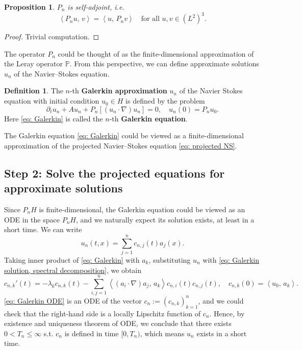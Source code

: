 \documentclass[a4paper, 12pt, oneside]{amsart}
\newtheorem{proposition}[theorem]{Proposition}
\theoremstyle{definition}
\newtheorem*{definition}{Definition}
\theoremstyle{remark}
\newcommand{\bk}[2]{\left\langle #1,\, #2 \right\rangle}
\renewcommand{\leq}{\leqslant}
\newcommand{\p}{\partial}
\newcommand{\mb}[1]{\mathbb{#1}}
\begin{document}
\begin{proposition}
    $P_n$ is self-adjoint, i.e.
    \[
        \bk{P_n u}{v} = \bk{u}{P_n v}\quad\text{for all $u, v\in (L^2)^3$}.
    \]
\end{proposition}

\begin{proof}
    Trivial computation.
\end{proof}

The operator $P_n$ could be thought of as the finite-dimensional approximation of the Leray operator $\mb{P}$. From this perspective, we can define approximate solutions $u_n$ of the Navier--Stokes equation.

\begin{definition}
    The $n$-th \textbf{Galerkin approximation} $u_n$ of the Navier Stokes equation with initial condition $u_0\in H$ is defined by the problem
    \begin{equation}
        \label{eq: Galerkin}
        \p_t u_n + Au_n + P_n[(u_n\cdot\nabla)u_n] = 0,\quad u_n(0)=P_nu_0. 
    \end{equation}
    Here \eqref{eq: Galerkin} is called the $n$-th \textbf{Galerkin equation}.
\end{definition}

The Galerkin equation \eqref{eq: Galerkin} could be viewed as a finite-dimensional approximation of the projected Navier--Stokes equation \eqref{eq: projected NS}. 

\subsection*{Step 2: Solve the projected equations for approximate solutions}

Since $P_nH$ is finite-dimensional, the Galerkin equation could be viewed as an ODE in the space $P_nH$, and we naturally expect its solution exists, at least in a short time. We can write
\begin{equation}
    \label{eq: Galerkin solution, spectral decomposition}
    u_n(t, x) = \sum_{j=1}^n c_{n, j}(t)a_j(x).
\end{equation}
Taking inner product of \eqref{eq: Galerkin} with $a_k$, substituting $u_n$ with \eqref{eq: Galerkin solution, spectral decomposition}, we obtain
\begin{equation}
    \label{eq: Galerkin ODE}
    c_{n, k}'(t) = -\lambda_kc_{n, k}(t) - \sum_{i, j=1}^n \bk{(a_i\cdot\nabla)a_j}{a_k} c_{n, i}(t)c_{n, j}(t),\quad c_{n, k}(0) = \bk{u_0}{a_k}.
\end{equation}
\eqref{eq: Galerkin ODE} is an ODE of the vector $c_n := (c_{n, k})_{k=1}^n$, and we could check that the right-hand side is a locally Lipschitz function of $c_n$. Hence, by existence and uniqueness theorem of ODE, we conclude that there exists $0<T_n\leq\infty$ s.t. $c_n$ is defined in time $[0, T_n)$, which means $u_n$ exists in a short time.
\end{document}
